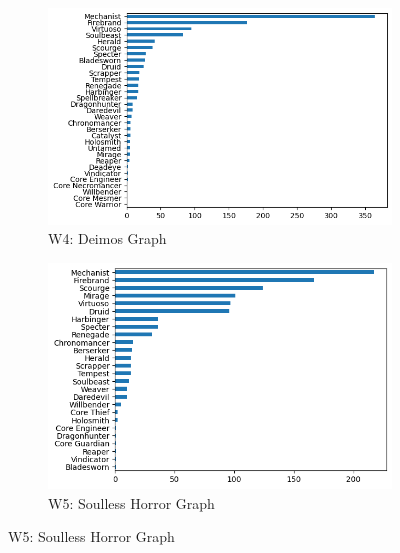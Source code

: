 \documentclass[12pt,a4paper]{article}
\begin{document}
    \begin{figure}[h!]
        
        \centering

        \begin{subfigure}{0.5\textwidth}
            \centering
            \includegraphics[scale=0.4]{dei_graph.png}
            \caption{\small W4: Deimos Graph}
        \end{subfigure}%
        \begin{subfigure}{0.5\textwidth}
            \centering
            \includegraphics[scale=0.4]{sh_graph.png}
            \caption{\small W5: Soulless Horror Graph}
        \end{subfigure}


\end{figure}
\end{document}
